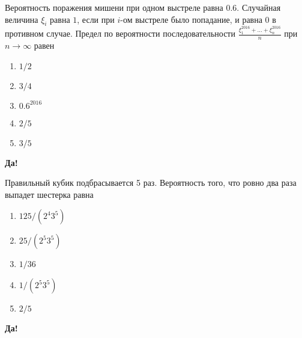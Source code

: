 \documentclass[t]{beamer}
\begin{document}
 \begin{frame} \label{21-Yes} 
\begin{block}{21} 

  Вероятность поражения мишени при одном выстреле равна $0.6$. Случайная величина $\xi_i$  равна $1$, если при $i$-ом выстреле было попадание, и равна $0$ в противном случае. Предел по вероятности последовательности $\frac{\xi_1^{2016} + \ldots + \xi_n^{2016}}{n}$ при $n \rightarrow \infty$ равен
  


 \end{block} 
\begin{enumerate} 
\item[] \hyperlink{21-No}{\beamergotobutton{} $1/2$}
\item[] \hyperlink{21-No}{\beamergotobutton{} $3/4$}
\item[] \hyperlink{21-No}{\beamergotobutton{} $0.6^2016$}
\item[] \hyperlink{21-No}{\beamergotobutton{} $2/5$}
\item[] \hyperlink{21-Yes}{\beamergotobutton{} $3/5$}
\end{enumerate} 

 \textbf{Да!} 
 \hyperlink{22}{}\end{frame} 


 \begin{frame} \label{22-Yes} 
\begin{block}{22} 

  Правильный кубик подбрасывается 5 раз. Вероятность того, что ровно два раза выпадет шестерка равна
  


 \end{block} 
\begin{enumerate} 
\item[] \hyperlink{22-No}{\beamergotobutton{} $125/(2^4 3^5)$}
\item[] \hyperlink{22-No}{\beamergotobutton{} $25/(2^5 3^5)$}
\item[] \hyperlink{22-No}{\beamergotobutton{} $1/36$}
\item[] \hyperlink{22-No}{\beamergotobutton{} $1/(2^5 3^5)$}
\item[] \hyperlink{22-No}{\beamergotobutton{} $2/5$}
\end{enumerate} 

 \textbf{Да!} 
 \hyperlink{23}{}\end{frame} 
\end{document}

